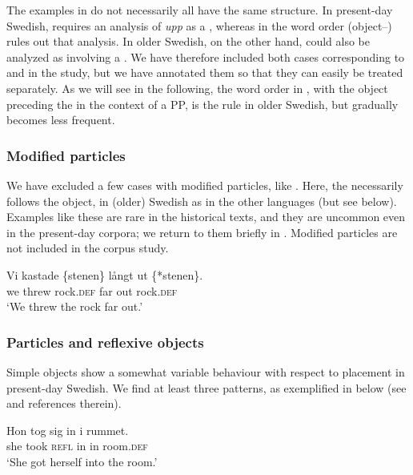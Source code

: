 \documentclass[output=paper]{langscibook}
\begin{document}
The examples in  do not necessarily all have the same structure. In present-day Swedish,  requires an analysis of \textit{upp} as a , whereas in  the word order (object–) rules out that analysis. In older Swedish, on the other hand,  could also be analyzed as involving a . We have therefore included both cases corresponding to  and  in the study, but we have annotated them so that they can easily be treated separately. As we will see in the following, the word order in , with the object preceding the  in the context of a PP, is the rule in older Swedish, but gradually becomes less frequent.



\subsubsection{Modified particles} 
We have excluded a few cases with modified particles, like . Here, the  necessarily follows the object, in (older) Swedish as in the other  languages (but see  below). Examples like these are rare in the historical texts, and they are uncommon even in the present-day corpora; we return to them briefly in . Modified particles are not included in the corpus study.


\ea\label{ex:lalu:18}
\gll Vi    kastade   \{stenen\}     långt  ut \{*stenen\}.\\
we    threw       rock\textsc{.def}   far   out     rock\textsc{.def}    \\
\glt `We threw the rock far out.'
\z


\subsubsection{Particles and reflexive objects} 
Simple  objects show a somewhat variable behaviour with respect to  placement in present-day Swedish. We find at least three patterns, as exemplified in  below (see \citealt{Lundquist2014Reflexive} and references therein).


\ea\label{ex:lalu:19}
\ea\label{ex:lalu:19a}
\gll  Hon   tog     sig     in   i     rummet.\\
    she       took   \textsc{refl}   in   in     room\textsc{.def}\\
\glt `She got herself into the room.’\\
\end{document}
